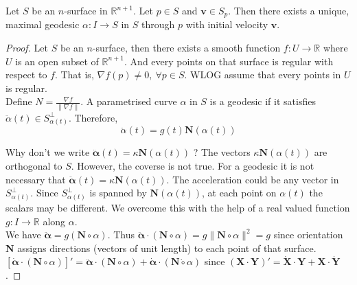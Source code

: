 \begin{theorem}
	Let $S$ be an $n$-surface in $\mathbb{R}^{n+1}$.
	Let $p \in S$ and $\boldsymbol{v} \in S_p$.
	Then there exists a unique, maximal geodesic $\alpha : I \to S$ in $S$ through $p$ with initial velocity $\boldsymbol{v}$.
\end{theorem}
\begin{proof}
	Let $S$ be an $n$-surface, then there exists a smooth function $f : U \to \mathbb{R}$ where $U$ is an open subset of $\mathbb{R}^{n+1}$.
	And every points on that surface is regular with respect to $f$.
	That is, $\nabla f(p) \ne 0,\ \forall p \in S$.
	WLOG assume that every points in $U$ is regular.\\
	

	Define $N = \frac{\nabla f}{\|\nabla f\|}$.
	A parametrised curve $\alpha$ in $S$ is a geodesic if it satisfies $\ddot{\alpha}(t) \in S_{\alpha(t)}^\perp$.
	Therefore,
	\begin{equation}
		\ddot{\alpha}(t) = g(t)\boldsymbol{N}(\alpha(t))
		\label{eq:acceleration}
	\end{equation}
	

	Why don't we write $\ddot{\boldsymbol{\alpha}}(t) = \kappa \boldsymbol{N}(\alpha(t))$ ? The vectors $\kappa \boldsymbol{N}(\alpha(t))$ are orthogonal to $S$.
	However, the coverse is not true.
	For a geodesic it is not necessary that $\ddot{\boldsymbol{\alpha}}(t) =  \kappa \boldsymbol{N}(\alpha(t))$.
	The acceleration could be any vector in $S_{\alpha(t)}^\perp$.
	Since $S_{\alpha(t)}^\perp$ is spanned by $\boldsymbol{N}(\alpha(t))$, at each point on $\alpha(t)$ the scalars may be different.
	We overcome this with the help of a real valued function $g : I \to \mathbb{R}$ along $\alpha$.\\


	We have $\ddot{\boldsymbol{\alpha}} = g(\boldsymbol{N}\circ \alpha)$.
	Thus $\ddot{\boldsymbol{\alpha}} \cdot (\boldsymbol{N}\circ\alpha) = g \| \boldsymbol{N}\circ \alpha \|^2 = g$ since orientation $\boldsymbol{N}$ assigns directions (vectors of unit length) to each point of that surface.\\


	$\left[\dot{\boldsymbol{\alpha}} \cdot (\boldsymbol{N} \circ \alpha)\right]' = \ddot{\boldsymbol{\alpha}} \cdot (\boldsymbol{N} \circ \alpha) + \dot{\boldsymbol{\alpha}} \cdot (\boldsymbol{N} \dot{\circ} \alpha)$	since $(\boldsymbol{X} \cdot \boldsymbol{Y})' = \dot{\boldsymbol{X}} \cdot \boldsymbol{Y} + \boldsymbol{X} \cdot \dot{\boldsymbol{Y}}$.


\end{proof}
